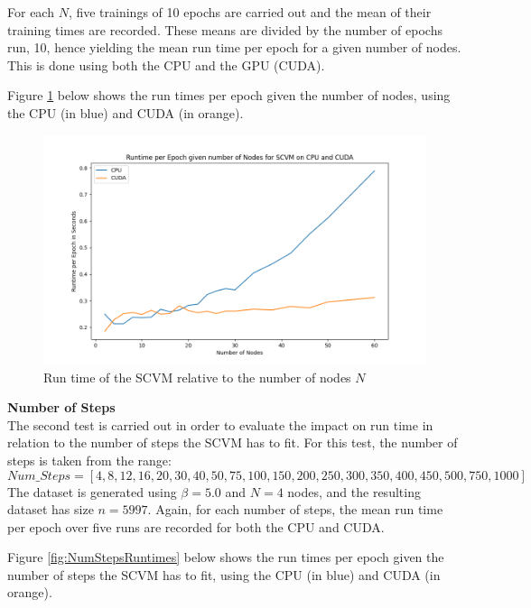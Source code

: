 For each $N$, five trainings of 10 epochs are carried out and the mean of their training times are recorded.
These means are divided by the number of epochs run, 10, hence yielding the mean run time per epoch for a given number of nodes.
This is done using both the CPU and the GPU (CUDA).

Figure \ref{fig:NumNodesRuntimes} below shows the run times per epoch given the number of nodes, using the CPU (in blue) and CUDA (in orange).

\begin{figure}[H]
    \centering
    \includegraphics[width=\textwidth]{0_images/numnodes_runtime2.png}
    \caption{Run time of the SCVM relative to the number of nodes $N$}
    \label{fig:NumNodesRuntimes}
\end{figure}
\textbf{Number of Steps}
\\
The second test is carried out in order to evaluate the impact on run time in relation to the number of steps the SCVM has to fit.
For this test, the number of steps is taken from the range:
\begin{equation}
    Num\_Steps = [4,8,12,16,20,30,40,50,75,100,150,200,250,300,350,400,450,500,750,1000]
\end{equation}
The dataset is generated using $\beta = 5.0$ and $N = 4$ nodes, and the resulting dataset has size $n = 5997$.
Again, for each number of steps, the mean run time per epoch over five runs are recorded for both the CPU and CUDA.

Figure \ref{fig:NumStepsRuntimes} below shows the run times per epoch given the number of steps the SCVM has to fit, using the CPU (in blue) and CUDA (in orange).

